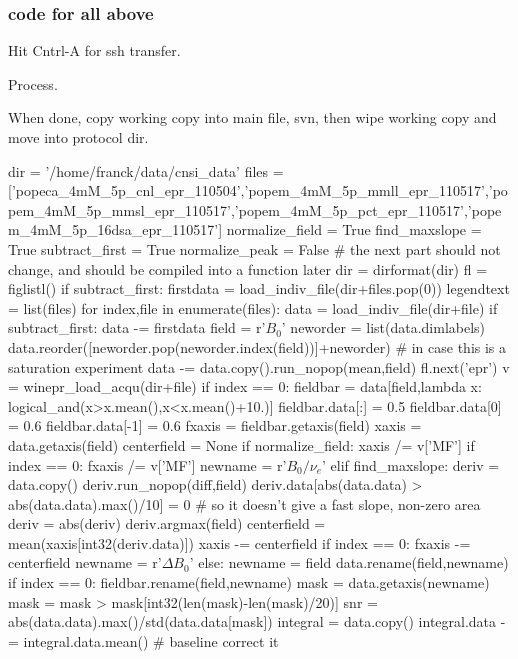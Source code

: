 \subsubsection{code for all above}
Hit Cntrl-A for ssh transfer.

Process.

When done, copy working copy into main file, svn, then wipe working copy and move into protocol dir.

\begin{tiny}
\begin{python}
dir = '/home/franck/data/cnsi_data'
files = ['popeca_4mM_5p_cnl_epr_110504','popem_4mM_5p_mmll_epr_110517','popem_4mM_5p_mmsl_epr_110517','popem_4mM_5p_pct_epr_110517','popem_4mM_5p_16dsa_epr_110517']
normalize_field = True
find_maxslope = True
subtract_first = True
normalize_peak = False
# the next part should not change, and should be compiled into a function later
dir = dirformat(dir)
fl = figlistl()
if subtract_first:
    firstdata = load_indiv_file(dir+files.pop(0))
legendtext = list(files)
for index,file in enumerate(files):
   data = load_indiv_file(dir+file)
   if subtract_first:
       data -= firstdata
   field = r'$B_0$'
   neworder = list(data.dimlabels)
   data.reorder([neworder.pop(neworder.index(field))]+neworder) # in case this is a saturation experiment
   data -= data.copy().run_nopop(mean,field)
   fl.next('epr')
   v = winepr_load_acqu(dir+file)
   if index == 0:
        fieldbar = data[field,lambda x: logical_and(x>x.mean(),x<x.mean()+10.)]
        fieldbar.data[:] = 0.5
        fieldbar.data[0] = 0.6
        fieldbar.data[-1] = 0.6
        fxaxis = fieldbar.getaxis(field)
   xaxis = data.getaxis(field)
   centerfield = None
   if normalize_field:
       xaxis /= v['MF']
       if index == 0:
           fxaxis /= v['MF']
       newname = r'$B_0/\nu_e$'
   elif find_maxslope:
       deriv = data.copy()
       deriv.run_nopop(diff,field)
       deriv.data[abs(data.data) > abs(data.data).max()/10] = 0 # so it doesn't give a fast slope, non-zero area
       deriv = abs(deriv)
       deriv.argmax(field)
       centerfield = mean(xaxis[int32(deriv.data)])
       xaxis -= centerfield
       if index == 0:
           fxaxis -= centerfield
       newname = r'$\Delta B_0$'
   else:
       newname = field
   data.rename(field,newname)
   if index == 0:
       fieldbar.rename(field,newname)
   mask = data.getaxis(newname)
   mask = mask > mask[int32(len(mask)-len(mask)/20)]
   snr = abs(data.data).max()/std(data.data[mask])
   integral = data.copy()
   integral.data -= integral.data.mean() # baseline correct it

\end{python}
\end{tiny}
